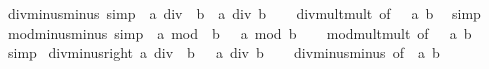\begin{isabellebody}
%
\isadelimproof
%
\endisadelimproof
\isanewline
\isanewline
{}\isamarkupfalse%
\ div{\isacharunderscore}{\kern0pt}minus{\isacharunderscore}{\kern0pt}minus\ {\isacharbrackleft}{\kern0pt}simp{\isacharbrackright}{\kern0pt}{\isacharcolon}{\kern0pt}\ {\isachardoublequoteopen}{\isacharparenleft}{\kern0pt}{\isacharminus}{\kern0pt}\ a{\isacharparenright}{\kern0pt}\ div\ {\isacharparenleft}{\kern0pt}{\isacharminus}{\kern0pt}\ b{\isacharparenright}{\kern0pt}\ {\isacharequal}{\kern0pt}\ a\ div\ b{\isachardoublequoteclose}\isanewline
%
\isadelimproof
\ \ %
\endisadelimproof
%
\isatagproof
{}\isamarkupfalse%
\ div{\isacharunderscore}{\kern0pt}mult{\isacharunderscore}{\kern0pt}mult{}\ {\isacharbrackleft}{\kern0pt}of\ {\isachardoublequoteopen}{\isacharminus}{\kern0pt}\ {}{\isachardoublequoteclose}\ a\ b{\isacharbrackright}{\kern0pt}\ \isamarkupfalse%
\ simp%
\endisatagproof
{\isafoldproof}%
%
\isadelimproof
\isanewline
%
\endisadelimproof
\isanewline
{}\isamarkupfalse%
\ mod{\isacharunderscore}{\kern0pt}minus{\isacharunderscore}{\kern0pt}minus\ {\isacharbrackleft}{\kern0pt}simp{\isacharbrackright}{\kern0pt}{\isacharcolon}{\kern0pt}\ {\isachardoublequoteopen}{\isacharparenleft}{\kern0pt}{\isacharminus}{\kern0pt}\ a{\isacharparenright}{\kern0pt}\ mod\ {\isacharparenleft}{\kern0pt}{\isacharminus}{\kern0pt}\ b{\isacharparenright}{\kern0pt}\ {\isacharequal}{\kern0pt}\ {\isacharminus}{\kern0pt}\ {\isacharparenleft}{\kern0pt}a\ mod\ b{\isacharparenright}{\kern0pt}{\isachardoublequoteclose}\isanewline
%
\isadelimproof
\ \ %
\endisadelimproof
%
\isatagproof
{}\isamarkupfalse%
\ mod{\isacharunderscore}{\kern0pt}mult{\isacharunderscore}{\kern0pt}mult{}\ {\isacharbrackleft}{\kern0pt}of\ {\isachardoublequoteopen}{\isacharminus}{\kern0pt}\ {}{\isachardoublequoteclose}\ a\ b{\isacharbrackright}{\kern0pt}\ \isamarkupfalse%
\ simp%
\endisatagproof
{\isafoldproof}%
%
\isadelimproof
\isanewline
%
\endisadelimproof
\isanewline
{}\isamarkupfalse%
\ div{\isacharunderscore}{\kern0pt}minus{\isacharunderscore}{\kern0pt}right{\isacharcolon}{\kern0pt}\ {\isachardoublequoteopen}a\ div\ {\isacharparenleft}{\kern0pt}{\isacharminus}{\kern0pt}\ b{\isacharparenright}{\kern0pt}\ {\isacharequal}{\kern0pt}\ {\isacharparenleft}{\kern0pt}{\isacharminus}{\kern0pt}\ a{\isacharparenright}{\kern0pt}\ div\ b{\isachardoublequoteclose}\isanewline
%
\isadelimproof
\ \ %
\endisadelimproof
%
\isatagproof
{}\isamarkupfalse%
\ div{\isacharunderscore}{\kern0pt}minus{\isacharunderscore}{\kern0pt}minus\ {\isacharbrackleft}{\kern0pt}of\ {\isachardoublequoteopen}{\isacharminus}{\kern0pt}\ a{\isachardoublequoteclose}\ b{\isacharbrackright}{\kern0pt}\ \isamarkupfalse%

\end{isabellebody}
